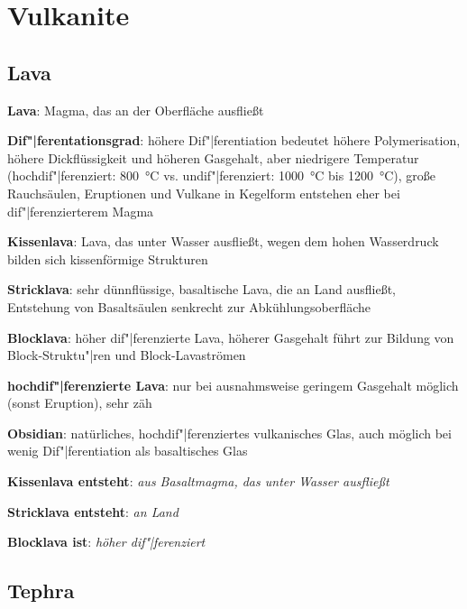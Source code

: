 \chapter{%
    Vulkanite%
}

\section{%
    Lava%
}

\textbf{Lava}:
Magma, das an der Oberfläche ausfließt

\textbf{Dif"|ferentationsgrad}:
höhere Dif"|ferentiation bedeutet
höhere Polymerisation,
höhere Dickflüssigkeit und
höheren Gasgehalt,
aber niedrigere Temperatur
(hochdif"|ferenziert: \SI{800}{\celsius} vs. undif"|ferenziert: \SI{1000}{\celsius} bis \SI{1200}{\celsius}),
große Rauchsäulen, Eruptionen und Vulkane in Kegelform entstehen eher bei dif"|ferenzierterem Magma

\textbf{Kissenlava}:
Lava, das unter Wasser ausfließt,
wegen dem hohen Wasserdruck bilden sich kissenförmige Strukturen

\textbf{Stricklava}:
sehr dünnflüssige, basaltische Lava, die an Land ausfließt,
Entstehung von Basaltsäulen senkrecht zur Abkühlungsoberfläche

\textbf{Blocklava}:
höher dif"|ferenzierte Lava,
höherer Gasgehalt führt zur Bildung von Block-Struktu"|ren und Block-Lavaströmen

\textbf{hochdif"|ferenzierte Lava}:
nur bei ausnahmsweise geringem Gasgehalt möglich (sonst Eruption),
sehr zäh

\textbf{Obsidian}:
natürliches, hochdif"|ferenziertes vulkanisches Glas,
auch möglich bei wenig Dif"|ferentiation als basaltisches Glas

\begin{wichtig}
    \item
    \textbf{Kissenlava entsteht}:
    \emph{aus Basaltmagma, das unter Wasser ausfließt}

    \item
    \textbf{Stricklava entsteht}:
    \emph{an Land}

    \item
    \textbf{Blocklava ist}:
    \emph{höher dif"|ferenziert}
\end{wichtig}

\section{%
    Tephra%
}

